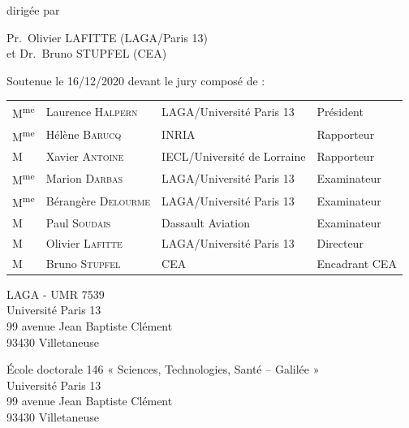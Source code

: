 \begin{titlepage}
\begin{center}
{
    \large dirigée par}

{
    \Large
    Pr.~Olivier LAFITTE (LAGA/Paris 13)\\
    et Dr.~Bruno STUPFEL (CEA)
}



{
    \large Soutenue le 16/12/2020 devant le jury composé de :
}
\newcommand{\mme}{M\textsuperscript{me}}

{
    \large
    \begin{tabular}{llll}
    \mme& Laurence \textsc{Halpern} & LAGA/Université Paris 13 & Président
    \\
    \mme& Hélène \textsc{Barucq} & INRIA & Rapporteur
    \\
    M& Xavier \textsc{Antoine} & IECL/Université de Lorraine & Rapporteur
    \\
    \mme& Marion \textsc{Darbas} & LAGA/Université Paris 13 & Examinateur
    \\
    \mme& Bérangère \textsc{Delourme} & LAGA/Université Paris 13 & Examinateur
    \\
    M& Paul \textsc{Soudais} & Dassault Aviation & Examinateur
    \\
    M& Olivier \textsc{Lafitte} & LAGA/Université Paris 13 & Directeur
    \\
    M& Bruno \textsc{Stupfel} & CEA & Encadrant CEA
    \\
    \end{tabular}
}

\end{center}

\newpage
\thispagestyle{empty}
\vspace*{\fill}

\noindent
\begin{center}
\begin{minipage}[t]{0.5\textwidth}
LAGA - UMR 7539\\
Université Paris 13\\
99 avenue Jean Baptiste Clément\\
93430 Villetaneuse
\end{minipage}%
%
\hfill%
%
\begin{minipage}[t]{0.5\textwidth}
École doctorale 146 « Sciences, Technologies, Santé – Galilée »\\
Université Paris 13\\
99 avenue Jean Baptiste Clément\\
93430 Villetaneuse
\end{minipage}
\end{center}



\end{titlepage}
\hypersetup{pageanchor=true}
\cleardoublepage
